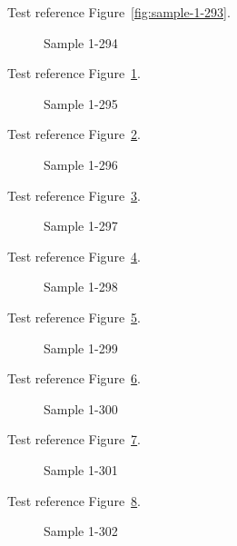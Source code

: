 Test reference Figure~\ref{fig:sample-1-293}.

\begin{figure}[tbhp]
\caption{Sample 1-294}
\label{fig:sample-1-294}
\end{figure}

Test reference Figure~\ref{fig:sample-1-294}.

\begin{figure}[tbhp]
\caption{Sample 1-295}
\label{fig:sample-1-295}
\end{figure}

Test reference Figure~\ref{fig:sample-1-295}.

\begin{figure}[tbhp]
\caption{Sample 1-296}
\label{fig:sample-1-296}
\end{figure}

Test reference Figure~\ref{fig:sample-1-296}.

\begin{figure}[tbhp]
\caption{Sample 1-297}
\label{fig:sample-1-297}
\end{figure}

Test reference Figure~\ref{fig:sample-1-297}.

\begin{figure}[tbhp]
\caption{Sample 1-298}
\label{fig:sample-1-298}
\end{figure}

Test reference Figure~\ref{fig:sample-1-298}.

\begin{figure}[tbhp]
\caption{Sample 1-299}
\label{fig:sample-1-299}
\end{figure}

Test reference Figure~\ref{fig:sample-1-299}.

\begin{figure}[tbhp]
\caption{Sample 1-300}
\label{fig:sample-1-300}
\end{figure}

Test reference Figure~\ref{fig:sample-1-300}.

\begin{figure}[tbhp]
\caption{Sample 1-301}
\label{fig:sample-1-301}
\end{figure}

Test reference Figure~\ref{fig:sample-1-301}.

\begin{figure}[tbhp]
\caption{Sample 1-302}
\label{fig:sample-1-302}
\end{figure}

